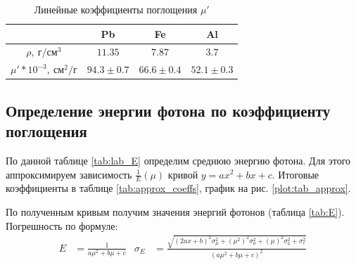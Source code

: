 \documentclass[a4paper, 12pt]{article}
\begin{document}
            \begin{table}[!ht]
                \centering
                \begin{tabular}{|c|c|c|c|}
                    \hline

                     & Pb & Fe & Al\\ \hline
                    $\rho,~г/см^3$ & $11.35$ & $7.87$ & $3.7$\\ \hline
                    $\mu'*10^{-3},~см^2/г$ & $94.3 \pm 0.7$ & $66.6 \pm 0.4$ & $52.1 \pm 0.3$\\ \hline

                \end{tabular}
                \caption{Линейные коэффициенты поглощения $\mu'$}
                \label{tab:mu_m1}
            \end{table}

        \subsection{Определение энергии фотона по коэффициенту поглощения}

            По данной таблице \ref{tab:lab_E} определим среднюю энергию фотона. Для этого аппроксимируем зависимость $\frac{1}{E}(\mu)$ кривой $y = ax^2 + bx + c$. Итоговые коэффициенты в таблице \ref{tab:approx_coeffs}, график на рис. \ref{plot:tab_approx}.

            По полученным кривым получим значения энергий фотонов (таблица \ref{tab:E}). Погрешность по формуле:
            \begin{align*}
                E &= \frac{1}{a\mu^2 + b\mu + c} & \sigma_E &= \frac{\sqrt{\left( 2ax + b \right)^2 \sigma_{\mu}^2 + \left( \mu^2 \right)^2 \sigma_a^2 + \left( \mu \right)^2 \sigma_b^2 + \sigma_c^2}}{\left( a\mu^2 + b\mu + c \right)^2}
            \end{align*}
\end{document}
